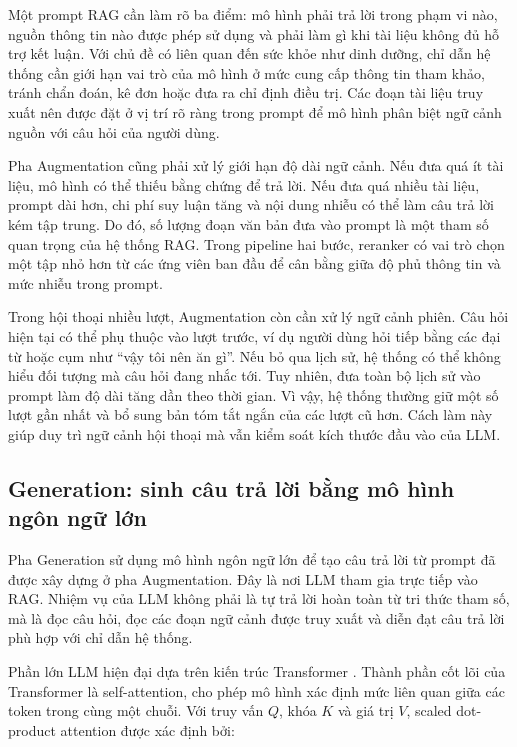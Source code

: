 \documentclass[a4paper,13pt,twoside]{report}
\begin{document}
Một prompt RAG cần làm rõ ba điểm: mô hình phải trả lời trong phạm vi nào, nguồn thông tin nào được phép sử dụng và phải làm gì khi tài liệu không đủ hỗ trợ kết luận. Với chủ đề có liên quan đến sức khỏe như dinh dưỡng, chỉ dẫn hệ thống cần giới hạn vai trò của mô hình ở mức cung cấp thông tin tham khảo, tránh chẩn đoán, kê đơn hoặc đưa ra chỉ định điều trị. Các đoạn tài liệu truy xuất nên được đặt ở vị trí rõ ràng trong prompt để mô hình phân biệt ngữ cảnh nguồn với câu hỏi của người dùng.

Pha Augmentation cũng phải xử lý giới hạn độ dài ngữ cảnh. Nếu đưa quá ít tài liệu, mô hình có thể thiếu bằng chứng để trả lời. Nếu đưa quá nhiều tài liệu, prompt dài hơn, chi phí suy luận tăng và nội dung nhiễu có thể làm câu trả lời kém tập trung. Do đó, số lượng đoạn văn bản đưa vào prompt là một tham số quan trọng của hệ thống RAG. Trong pipeline hai bước, reranker có vai trò chọn một tập nhỏ hơn từ các ứng viên ban đầu để cân bằng giữa độ phủ thông tin và mức nhiễu trong prompt.

Trong hội thoại nhiều lượt, Augmentation còn cần xử lý ngữ cảnh phiên. Câu hỏi hiện tại có thể phụ thuộc vào lượt trước, ví dụ người dùng hỏi tiếp bằng các đại từ hoặc cụm như ``vậy tôi nên ăn gì''. Nếu bỏ qua lịch sử, hệ thống có thể không hiểu đối tượng mà câu hỏi đang nhắc tới. Tuy nhiên, đưa toàn bộ lịch sử vào prompt làm độ dài tăng dần theo thời gian. Vì vậy, hệ thống thường giữ một số lượt gần nhất và bổ sung bản tóm tắt ngắn của các lượt cũ hơn. Cách làm này giúp duy trì ngữ cảnh hội thoại mà vẫn kiểm soát kích thước đầu vào của LLM.

\subsection{Generation: sinh câu trả lời bằng mô hình ngôn ngữ lớn}

Pha Generation sử dụng mô hình ngôn ngữ lớn để tạo câu trả lời từ prompt đã được xây dựng ở pha Augmentation. Đây là nơi LLM tham gia trực tiếp vào RAG. Nhiệm vụ của LLM không phải là tự trả lời hoàn toàn từ tri thức tham số, mà là đọc câu hỏi, đọc các đoạn ngữ cảnh được truy xuất và diễn đạt câu trả lời phù hợp với chỉ dẫn hệ thống.

Phần lớn LLM hiện đại dựa trên kiến trúc Transformer \cite{transformer}. Thành phần cốt lõi của Transformer là self-attention, cho phép mô hình xác định mức liên quan giữa các token trong cùng một chuỗi. Với truy vấn \(Q\), khóa \(K\) và giá trị \(V\), scaled dot-product attention được xác định bởi:
\end{document}
